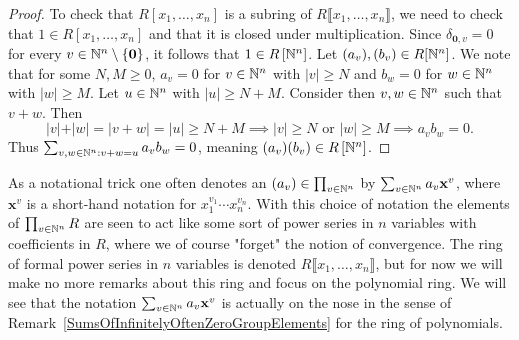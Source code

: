 \begin{proof}
    To check that $R[x_1,\dots,x_n]$ is a subring of $R\llbracket x_1,\dots,x_n \rrbracket$, we need to check that $1\in R[x_1,\dots,x_n]$ and that it is closed under multiplication. Since $\delta_{\mathbf{0},v}=0$ for every $v\in \mathbb{N}^n \setminus \{\mathbf{0}\}$, it follows that $1\in R\left[\mathbb{N}^n\right]$. Let $(a_v),(b_v)\in R[\mathbb{N}^n]$. We note that for some $N,M\geq 0$, $a_v = 0$ for $v\in \mathbb{N}^n$ with $\vert v\vert \geq N$ and $b_w = 0$ for $w\in \mathbb{N}^n$ with $\vert w \vert \geq M$. Let $u\in \mathbb{N}^n$ with $\vert u\vert \geq N+M$. Consider then $v,w \in \mathbb{N}^n$ such that $v+w$. Then
    $$\vert v\vert + \vert w\vert = \vert v +w \vert = \vert u\vert \geq N+M \implies \vert v\vert \geq N \text{ or } \vert w \vert \geq M \implies a_vb_w = 0. $$
    Thus $\sum_{v,w\in \mathbb{N}^n : v+w = u} a_vb_w =  0$, meaning $(a_v)(b_v) \in R\left[\mathbb{N}^n\right]$.
\end{proof}
\begin{remark}
    As a notational trick one often denotes an $(a_v) \in \prod_{v\in \mathbb{N}^n}$ by $\sum_{v\in \mathbb{N}^n} a_v\mathbf{x}^v$, where $\mathbf{x}^v$ is a short-hand notation for $x_1^{v_1}\cdots x_n^{v_n}$. With this choice of notation the elements of $\prod_{v\in \mathbb{N}^n} R$ are seen to act like some sort of power series in $n$ variables with coefficients in $R$, where we of course "forget" the notion of convergence. The ring of formal power series in $n$ variables is denoted $R\llbracket x_1,\dots,x_n\rrbracket$, but for now we will make no more remarks about this ring and focus on the polynomial ring. We will see that the notation $\sum_{v\in \mathbb{N}^n} a_v\mathbf{x}^{v}$ is actually on the nose in the sense of Remark~\ref{SumsOfInfinitelyOftenZeroGroupElements} for the ring of polynomials. 
\end{remark}
